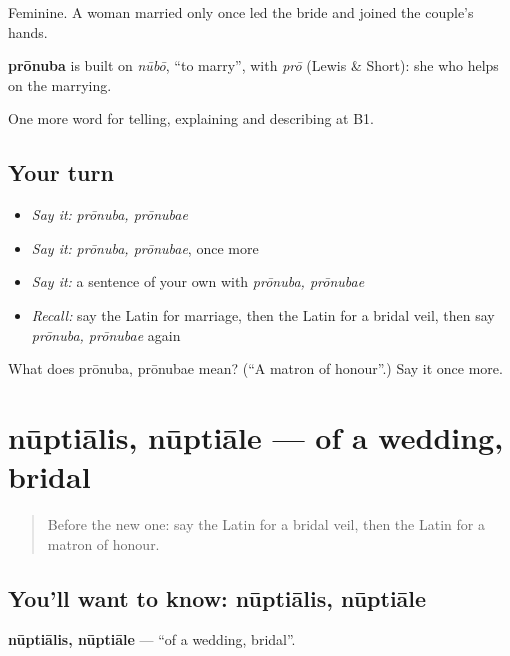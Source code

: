 Feminine. A woman married only once led the bride and joined the couple's hands.

\begin{cousinweb}
\textbf{prōnuba} is built on \emph{nūbō}, \textquotedblleft{}to marry\textquotedblright{}, with \emph{prō} (Lewis \& Short): she who helps on the marrying.
\end{cousinweb}

\begin{grammarlens}[title={What you've built}]
One more word for telling, explaining and describing at B1.
\end{grammarlens}

\subsection*{Your turn}
\begin{itemize}
\raggedright
  \item \emph{Say it:} \emph{prōnuba, prōnubae}
  \item \emph{Say it:} \emph{prōnuba, prōnubae}, once more
  \item \emph{Say it:} a sentence of your own with \emph{prōnuba, prōnubae}
  \item \emph{Recall:} say the Latin for marriage, then the Latin for a bridal veil, then say \emph{prōnuba, prōnubae} again
\end{itemize}

\begin{tcolorbox}[breakable,colback=teal!4,colframe=teal!35!black,title={Before you move on}]
What does prōnuba, prōnubae mean? (\textquotedblleft{}A matron of honour\textquotedblright{}.) Say it once more.
\end{tcolorbox}
\section[nūptiālis, nūptiāle]{nūptiālis, nūptiāle — of a wedding, bridal}

\label{lesson:LA-C328-nuptialis}



\begin{quote}
Before the new one: say the Latin for a bridal veil, then the Latin for a matron of honour.
\end{quote}

\subsection*{You'll want to know: nūptiālis, nūptiāle}
\textbf{nūptiālis, nūptiāle} — \textquotedblleft{}of a wedding, bridal\textquotedblright{}.

